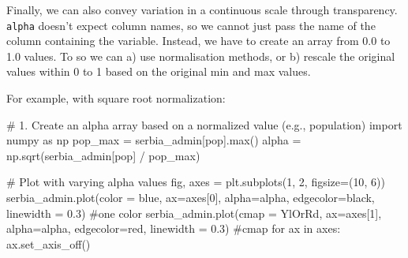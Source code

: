 \documentclass[
  letterpaper,
  DIV=11,
  numbers=noendperiod]{scrreprt}
\newenvironment{Shaded}{\begin{snugshade}}{\end{snugshade}}
\newcommand{\BuiltInTok}[1]{\textcolor[rgb]{0.00,0.23,0.31}{#1}}
\newcommand{\CommentTok}[1]{\textcolor[rgb]{0.37,0.37,0.37}{#1}}
\newcommand{\ControlFlowTok}[1]{\textcolor[rgb]{0.00,0.23,0.31}{#1}}
\newcommand{\DecValTok}[1]{\textcolor[rgb]{0.68,0.00,0.00}{#1}}
\newcommand{\FloatTok}[1]{\textcolor[rgb]{0.68,0.00,0.00}{#1}}
\newcommand{\ImportTok}[1]{\textcolor[rgb]{0.00,0.46,0.62}{#1}}
\newcommand{\KeywordTok}[1]{\textcolor[rgb]{0.00,0.23,0.31}{#1}}
\newcommand{\NormalTok}[1]{\textcolor[rgb]{0.00,0.23,0.31}{#1}}
\newcommand{\OperatorTok}[1]{\textcolor[rgb]{0.37,0.37,0.37}{#1}}
\newcommand{\StringTok}[1]{\textcolor[rgb]{0.13,0.47,0.30}{#1}}
\begin{document}
Finally, we can also convey variation in a continuous scale through
transparency. \texttt{alpha} doesn't expect column names, so we cannot
just pass the name of the column containing the variable. Instead, we
have to create an array from 0.0 to 1.0 values. To so we can a) use
normalisation methods, or b) rescale the original values within 0 to 1
based on the original min and max values.

For example, with square root normalization:

\begin{Shaded}
\begin{Highlighting}[]
\CommentTok{\# 1. Create an alpha array based on a normalized value (e.g., population)}
\ImportTok{import}\NormalTok{ numpy }\ImportTok{as}\NormalTok{ np}
\NormalTok{pop\_max }\OperatorTok{=}\NormalTok{ serbia\_admin[}\StringTok{\textquotesingle{}pop\textquotesingle{}}\NormalTok{].}\BuiltInTok{max}\NormalTok{()}
\NormalTok{alpha }\OperatorTok{=}\NormalTok{ np.sqrt(serbia\_admin[}\StringTok{\textquotesingle{}pop\textquotesingle{}}\NormalTok{] }\OperatorTok{/}\NormalTok{ pop\_max) }
\end{Highlighting}
\end{Shaded}

\begin{Shaded}
\begin{Highlighting}[]
\CommentTok{\# Plot with varying alpha values}
\NormalTok{fig, axes }\OperatorTok{=}\NormalTok{ plt.subplots(}\DecValTok{1}\NormalTok{, }\DecValTok{2}\NormalTok{, figsize}\OperatorTok{=}\NormalTok{(}\DecValTok{10}\NormalTok{, }\DecValTok{6}\NormalTok{))}
\NormalTok{serbia\_admin.plot(color }\OperatorTok{=} \StringTok{\textquotesingle{}blue\textquotesingle{}}\NormalTok{, ax}\OperatorTok{=}\NormalTok{axes[}\DecValTok{0}\NormalTok{], alpha}\OperatorTok{=}\NormalTok{alpha, edgecolor}\OperatorTok{=}\StringTok{\textquotesingle{}black\textquotesingle{}}\NormalTok{, linewidth }\OperatorTok{=} \FloatTok{0.3}\NormalTok{) }\CommentTok{\#one color}
\NormalTok{serbia\_admin.plot(cmap }\OperatorTok{=} \StringTok{\textquotesingle{}YlOrRd\textquotesingle{}}\NormalTok{, ax}\OperatorTok{=}\NormalTok{axes[}\DecValTok{1}\NormalTok{], alpha}\OperatorTok{=}\NormalTok{alpha, edgecolor}\OperatorTok{=}\StringTok{\textquotesingle{}red\textquotesingle{}}\NormalTok{, linewidth }\OperatorTok{=} \FloatTok{0.3}\NormalTok{) }\CommentTok{\#cmap}
\ControlFlowTok{for}\NormalTok{ ax }\KeywordTok{in}\NormalTok{ axes:}
\NormalTok{    ax.set\_axis\_off()}
\end{Highlighting}
\end{Shaded}
\end{document}
